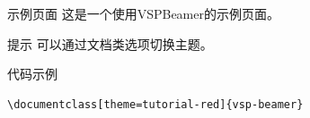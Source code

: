 \begin{frame}{示例页面}
    这是一个使用VSPBeamer的示例页面。

    \begin{vspquote}{提示}
        可以通过文档类选项切换主题。
    \end{vspquote}
\end{frame}

\begin{frame}[fragile]{代码示例}
\begin{verbatim}
\documentclass[theme=tutorial-red]{vsp-beamer}
\end{verbatim}
\end{frame}
